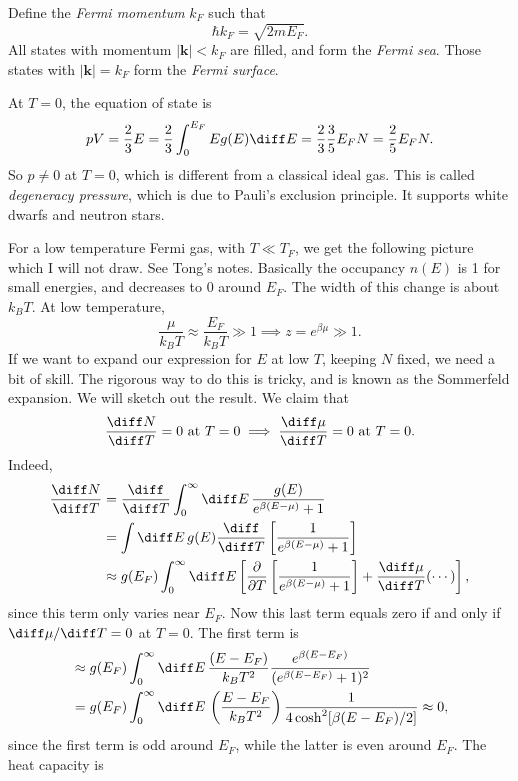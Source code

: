 \documentclass[12pt]{article}
\begin{document}
Define the \emph{Fermi momentum} $k_F$ such that
\[
	\hbar k_F = \sqrt{2m E_F}.
\]
All states with momentum $|\mathbf{k}| < k_F$ are filled, and form the \emph{Fermi sea}. Those states with $|\mathbf{k}| = k_F$ form the \emph{Fermi surface}.

At $T = 0$, the equation of state is
\[
pV = \frac{2}{3} E = \frac{2}{3} \int_0^{E_F} E g(E) \diff E = \frac{2}{3} \frac{3}{5} E_F N = \frac{2}{5} E_F N.
\]
So $p \neq 0$ at $T = 0$, which is different from a classical ideal gas. This is called \emph{degeneracy pressure}, which is due to Pauli's exclusion principle. It supports white dwarfs and neutron stars.

For a low temperature Fermi gas, with $T \ll T_F$, we get the following picture which I will not draw. See Tong's notes. Basically the occupancy $n(E)$ is 1 for small energies, and decreases to $0$ around $E_F$. The width of this change is about $k_B T$. At low temperature,
\[
\frac{\mu}{k_B T} \approx \frac{E_F}{k_B T} \gg 1 \implies z = e^{\beta \mu} \gg 1.
\]
If we want to expand our expression for $E$ at low $T$, keeping $N$ fixed, we need a bit of skill. The rigorous way to do this is tricky, and is known as the Sommerfeld expansion. We will sketch out the result. We claim that
\[
	\frac{\diff N}{\diff T} = 0 \text{ at } T = 0 \implies \frac{\diff \mu}{\diff T} = 0 \text{ at } T = 0.
\]
Indeed,
\begin{align*}
	\frac{\diff N}{\diff T} &= \frac{\diff}{\diff T} \int_0^\infty \diff E \, \frac{g(E)}{e^{\beta(E - \mu)} + 1} \\
				&= \int \diff E \, g(E) \frac{\diff}{\diff T} \left[ \frac{1}{e^{\beta(E - \mu)} + 1} \right] \\
				&\approx g(E_F) \int_0^\infty \diff E \left[ \frac{\partial}{\partial T} \left[ \frac{1}{e^{\beta(E - \mu)} + 1} \right] + \frac{\diff \mu}{\diff T} (\cdots) \right],
\end{align*}
since this term only varies near $E_F$. Now this last term equals zero if and only if $\diff \mu/\diff T = 0$ at $T = 0$. The first term is
\begin{align*}
	&\approx g(E_F) \int_0^\infty \diff E \, \frac{(E - E_F)}{k_B T^2} \frac{e^{\beta(E - E_F)}}{(e^{\beta(E - E_F)} + 1)^2} \\
	&= g(E_F) \int_0^\infty \diff E \, \left( \frac{E - E_F}{k_B T^2} \right) \frac{1}{4 \cosh^2[\beta(E - E_F)/2]} \approx 0,
\end{align*}
since the first term is odd around $E_F$, while the latter is even around $E_F$. The heat capacity is
\end{document}
